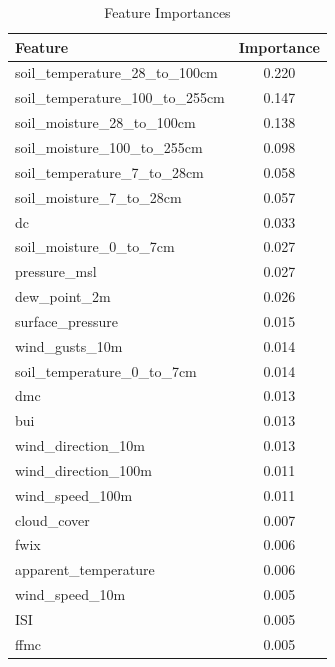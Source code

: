 \begin{table}[H]
	\caption{Feature Importances}
	\centering
	\label{feature_importances}
	\begin{tabular}{lc}
		\hline
		Feature                                & Importance \\ \hline
		soil\_temperature\_28\_to\_100cm       & 0.220       \\ 
		soil\_temperature\_100\_to\_255cm      & 0.147       \\ 
		soil\_moisture\_28\_to\_100cm          & 0.138       \\ 
		soil\_moisture\_100\_to\_255cm         & 0.098       \\ 
		soil\_temperature\_7\_to\_28cm         & 0.058       \\ 
		soil\_moisture\_7\_to\_28cm            & 0.057       \\ 
		dc                                      & 0.033       \\ 
		soil\_moisture\_0\_to\_7cm             & 0.027       \\ 
		pressure\_msl                           & 0.027       \\ 
		dew\_point\_2m                         & 0.026       \\ 
		surface\_pressure                      & 0.015       \\ 
		wind\_gusts\_10m                       & 0.014       \\ 
		soil\_temperature\_0\_to\_7cm          & 0.014       \\ 
		dmc                                     & 0.013       \\ 
		bui                                     & 0.013       \\ 
		wind\_direction\_10m                    & 0.013       \\ 
		wind\_direction\_100m                   & 0.011       \\ 
		wind\_speed\_100m                       & 0.011       \\ 
		cloud\_cover                           & 0.007       \\ 
		fwix                                     & 0.006       \\ 
		apparent\_temperature                 & 0.006       \\ 
		wind\_speed\_10m                       & 0.005       \\ 
		ISI                                     & 0.005       \\ 
		ffmc                                    & 0.005       \\ 

\end{tabular}
\end{table}
